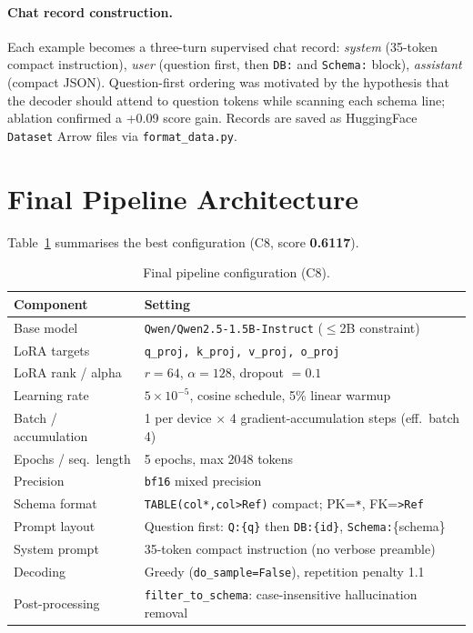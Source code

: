 \documentclass[11pt]{article}
\begin{document}
\paragraph{Chat record construction.}
Each example becomes a three-turn supervised chat record:
\textit{system} (35-token compact instruction),
\textit{user} (question first, then \texttt{DB:} and \texttt{Schema:} block),
\textit{assistant} (compact JSON).
Question-first ordering was motivated by the hypothesis that the decoder should attend to
question tokens while scanning each schema line; ablation confirmed a +0.09 score gain.
Records are saved as HuggingFace \texttt{Dataset} Arrow files via \texttt{format\_data.py}.

\section{Final Pipeline Architecture}

Table~\ref{tab:final} summarises the best configuration (C8, score \textbf{0.6117}).

\begin{table}[h]
\centering\small
\caption{Final pipeline configuration (C8).}
\label{tab:final}
\begin{tabular}{l l}
\toprule
\textbf{Component} & \textbf{Setting} \\
\midrule
Base model          & \texttt{Qwen/Qwen2.5-1.5B-Instruct} ($\le$2B constraint) \\
LoRA targets        & \texttt{q\_proj, k\_proj, v\_proj, o\_proj} \\
LoRA rank / alpha   & $r=64$, $\alpha=128$, dropout $=0.1$ \\
Learning rate       & $5\times10^{-5}$, cosine schedule, 5\% linear warmup \\
Batch / accumulation & 1 per device $\times$ 4 gradient-accumulation steps (eff.\ batch 4) \\
Epochs / seq.\ length & 5 epochs, max 2048 tokens \\
Precision           & \texttt{bf16} mixed precision \\
Schema format       & \texttt{TABLE(col*,col>Ref)} compact; PK=\texttt{*}, FK=\texttt{>Ref} \\
Prompt layout       & Question first: \texttt{Q:\{q\}} then \texttt{DB:\{id\}}, \texttt{Schema:}\{schema\} \\
System prompt       & 35-token compact instruction (no verbose preamble) \\
Decoding            & Greedy (\texttt{do\_sample=False}), repetition penalty 1.1 \\
Post-processing     & \texttt{filter\_to\_schema}: case-insensitive hallucination removal \\
\bottomrule
\end{tabular}
\end{table}
\end{document}

